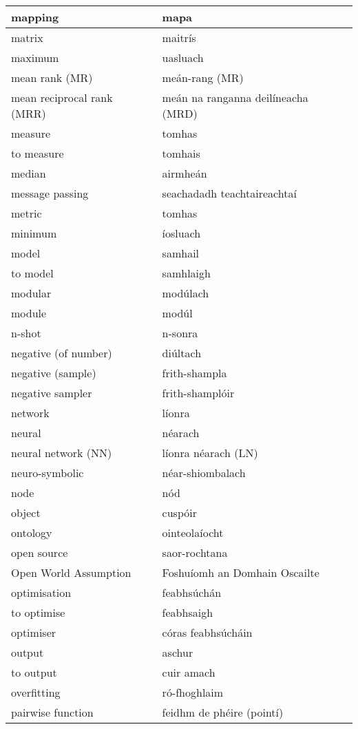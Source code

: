 \begin{longtable}{|l|l|}
		mapping&mapa\\ \hline 
		matrix&maitrís\\ \hline 
		maximum&uasluach\\ \hline 
		mean rank (MR)&meán-rang (MR)\\ \hline 
		mean reciprocal rank (MRR)&meán na ranganna deilíneacha (MRD)\\ \hline 
		measure&tomhas\\ \hline 
		to measure&tomhais\\ \hline 
		median&airmheán\\ \hline 
		message passing&seachadadh teachtaireachtaí\\ \hline 
		metric&tomhas\\ \hline 
		minimum&íosluach\\ \hline 
		model&samhail\\ \hline 
		to model&samhlaigh\\ \hline 
		modular&modúlach\\ \hline 
		module&modúl\\ \hline 
		n-shot&n-sonra\\ \hline 
		negative (of number)&diúltach\\ \hline 
		negative (sample)&frith-shampla\\ \hline 
		negative sampler&frith-shamplóir\\ \hline 
		network&líonra\\ \hline 
		neural&néarach\\ \hline 
		neural network (NN)&líonra néarach (LN)\\ \hline 
		neuro-symbolic&néar-shiombalach\\ \hline 
		node&nód\\ \hline 
		object&cuspóir\\ \hline 
		ontology&ointeolaíocht\\ \hline 
		open source&saor-rochtana\\ \hline 
		Open World Assumption&Foshuíomh an Domhain Oscailte\\ \hline 
		optimisation&feabhsúchán\\ \hline 
		to optimise&feabhsaigh\\ \hline 
		optimiser&córas feabhsúcháin\\ \hline 
		output&aschur\\ \hline 
		to output&cuir amach\\ \hline 
		overfitting&ró-fhoghlaim\\ \hline 
		pairwise function&feidhm de phéire (pointí)\\ \hline 

\end{longtable}
